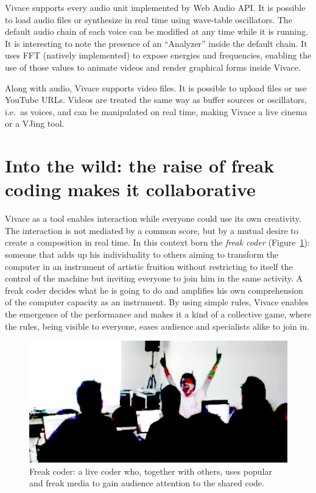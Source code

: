 \documentclass[letterpaper, 12pt]{article}
\begin{document}
Vivace supports every audio unit implemented by Web Audio API. It is
possible to load audio files or synthesize in real time using
wave-table oscillators. The default audio chain of each voice can be
modified at any time while it is running. It is interesting to note
the presence of an ``Analyzer'' inside the default chain. It uses FFT
(natively implemented) to expose energies and frequencies, enabling
the use of those values to animate videos and render graphical forms
inside Vivace.

Along with audio, Vivace supports video files. It is possible to
upload files or use YouTube URLs. Videos are treated the same way as
buffer sources or oscillators, i.e.\ as voices, and can be manipulated
on real time, making Vivace a live cinema or a VJing tool.

\section{Into the wild: the raise of freak coding makes it collaborative}

Vivace as a tool enables interaction while everyone could use its own
creativity. The interaction is not mediated by a common score, but by
a mutual desire to create a composition in real time. In this context
born the \emph{freak coder} (Figure~\ref{fig:freakcoder}): someone
that adds up his individuality to others aiming to transform the
computer in an instrument of artistic fruition without restricting to
itself the control of the machine but inviting everyone to join him in
the same activity. A freak coder decides what he is going to do and
amplifies his own comprehension of the computer capacity as an
instrument. By using simple rules, Vivace enables the emergence of the
performance and makes it a kind of a collective game, where the rules,
being visible to everyone, eases audience and specialists alike to
join in.

\begin{figure}[htpb]
  \begin{center}
    \includegraphics[scale=.4]{img/fig_freakcoder.png}
    \caption{Freak coder: a live coder who, together with others, uses
      popular and freak media to gain audience attention to the shared
      code.}
    \label{fig:freakcoder}
  \end{center}
\end{figure}
\end{document}
